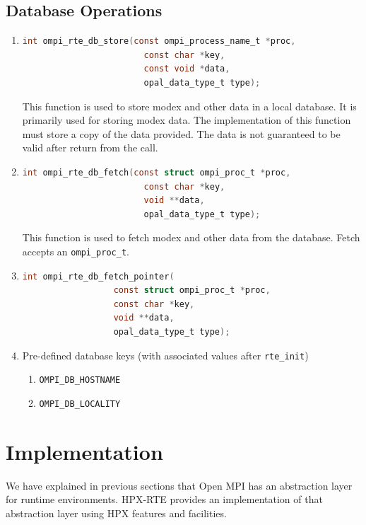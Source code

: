 \subsection{Database Operations}
\begin{enumerate}
\item
  \begin{lstlisting}[language=C]
  int ompi_rte_db_store(const ompi_process_name_t *proc,
                        const char *key,
                        const void *data,
                        opal_data_type_t type);
  \end{lstlisting}
  This function is used to store modex and other data in a local database. It is primarily used for storing modex data. The implementation of this function must store a copy of the data provided. The data is not guaranteed to be valid after return from the call.

\item
  \begin{lstlisting}[language=C]
  int ompi_rte_db_fetch(const struct ompi_proc_t *proc,
                        const char *key,
                        void **data,
                        opal_data_type_t type);
  \end{lstlisting}
  This function is used to fetch modex and other data from the database. Fetch accepts an \verb|ompi_proc_t|.

\item
  \begin{lstlisting}[language=C]
  int ompi_rte_db_fetch_pointer(
                  const struct ompi_proc_t *proc,
                  const char *key,
                  void **data,
                  opal_data_type_t type);  
  \end{lstlisting}
    
\item Pre-defined database keys (with associated values after \verb|rte_init|)
  \begin{enumerate}
    \item \verb|OMPI_DB_HOSTNAME|
    \item \verb|OMPI_DB_LOCALITY|
  \end{enumerate}
\end{enumerate}


\section{Implementation}
\label{sec:implementation}
We have explained in previous sections that Open MPI has an abstraction layer for runtime environments. HPX-RTE provides an implementation of that abstraction layer using HPX features and facilities.

